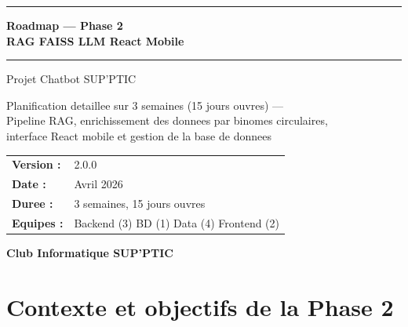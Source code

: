 \documentclass[11pt,a4paper]{article}
\begin{document}
\begin{titlepage}
\centering
\vspace*{1.5cm}
{\color{suppticblue}\rule{\linewidth}{1.5pt}}
\vspace{0.5cm}

{\Huge \textbf{Roadmap --- Phase 2}} \\[0.4cm]
{\LARGE \textbf{RAG \textperiodcentered{} FAISS \textperiodcentered{} LLM \textperiodcentered{} React Mobile}}

\vspace{0.5cm}
{\color{suppticblue}\rule{\linewidth}{1.5pt}}
\vspace{1.2cm}

{\Large Projet Chatbot SUP'PTIC}
\vspace{1cm}

\begin{minipage}{0.85\textwidth}
\centering
\normalsize
Planification detaillee sur 3 semaines (15 jours ouvres) ---\\
Pipeline RAG, enrichissement des donnees par binomes circulaires,\\
interface React mobile et gestion de la base de donnees
\end{minipage}

\vspace{1.5cm}
\begin{center}
\begin{tabular}{ll}
\textbf{Version :}   & 2.0.0 \\
\textbf{Date :}      & Avril 2026 \\
\textbf{Duree :}     & 3 semaines, 15 jours ouvres \\
\textbf{Equipes :}   & Backend (3) \textperiodcentered{} BD (1) \textperiodcentered{} Data (4) \textperiodcentered{} Frontend (2) \\
\end{tabular}
\end{center}

\vfill
\textbf{Club Informatique SUP'PTIC}
\end{titlepage}

\tableofcontents
\clearpage

\section{Contexte et objectifs de la Phase 2}
\end{document}
